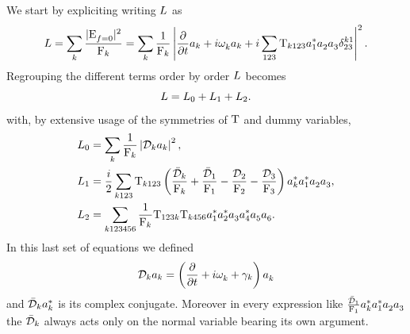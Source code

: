 We start by expliciting writing $L$ as
\begin{equation}
    L = \sum_k \frac{|\mathrm{E}_{f=0}^{}|^2}{\mathrm{F}_k} = \sum_k \frac{1}{\mathrm{F}_k} \left| \frac{\partial}{\partial t} a_k + i \omega^{}_k a_k + i \sum_{123}\mathrm{T}_{k123} a_1^*a_2^{}a_3^{} \delta^{k1}_{23} \right|^2.
\end{equation} 
Regrouping the different terms order by order $L$ becomes 
\begin{equation}
    L = L_0 + L_1 + L_2.
\end{equation}
with, by extensive usage of the symmetries of $\mathrm{T}$ and dummy variables, 
\begin{align}
    L_0 &= \sum_k\frac{1}{\mathrm{F}_k} \left| \mathcal{D}_k a_k  \right|^2, \\
    L_1 &= \frac{i}{2}\sum_{k123}\mathrm{T}_{k123}\left( \frac{\bar{\mathcal{D}}_k}{\mathrm{F}_k} + \frac{\bar{\mathcal{D}}_1}{\mathrm{F}_1} - \frac{\mathcal{D}_2}{\mathrm{F}_2} - \frac{\mathcal{D}_3}{\mathrm{F}_3} \right)
    a_k^* a_1^* a_2^{} a_3^{}, \\
    L_2 &= \sum_{k123456} \frac{1}{\mathrm{F}_k}\mathrm{T}_{123k}\mathrm{T}_{k456}a_1^* a_2^* a_3^{} a_4^* a_5^{} a_6^{}. 
\end{align}
In this last set of equations we defined 
\begin{equation}
    \mathcal{D}_k a_k = \left(\frac{\partial}{\partial t} + i\omega^{}_k+ \gamma_k\right)a_k^{}
\end{equation} 
and $\bar{\mathcal{D}}_k a_k^*$ is its complex conjugate. Moreover in every expression 
like $\frac{\bar{\mathcal{D}}_1}{\mathrm{F}_1}a_k^* a_1^* a_2^{} a_3^{}$ the $\bar{\mathcal{D}}_k$ always acts only on the normal variable bearing its own argument. \\

